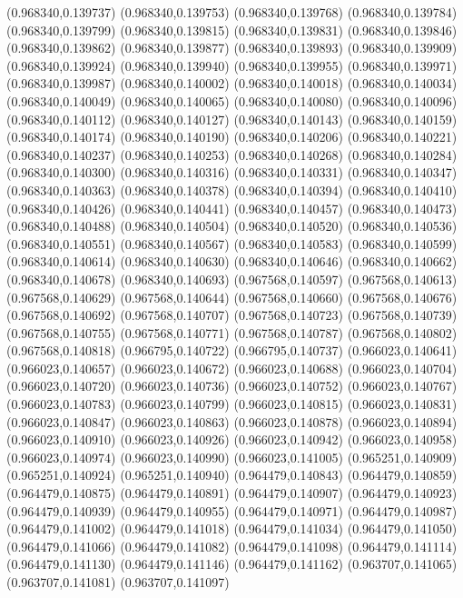 (0.968340,0.139737)
(0.968340,0.139753)
(0.968340,0.139768)
(0.968340,0.139784)
(0.968340,0.139799)
(0.968340,0.139815)
(0.968340,0.139831)
(0.968340,0.139846)
(0.968340,0.139862)
(0.968340,0.139877)
(0.968340,0.139893)
(0.968340,0.139909)
(0.968340,0.139924)
(0.968340,0.139940)
(0.968340,0.139955)
(0.968340,0.139971)
(0.968340,0.139987)
(0.968340,0.140002)
(0.968340,0.140018)
(0.968340,0.140034)
(0.968340,0.140049)
(0.968340,0.140065)
(0.968340,0.140080)
(0.968340,0.140096)
(0.968340,0.140112)
(0.968340,0.140127)
(0.968340,0.140143)
(0.968340,0.140159)
(0.968340,0.140174)
(0.968340,0.140190)
(0.968340,0.140206)
(0.968340,0.140221)
(0.968340,0.140237)
(0.968340,0.140253)
(0.968340,0.140268)
(0.968340,0.140284)
(0.968340,0.140300)
(0.968340,0.140316)
(0.968340,0.140331)
(0.968340,0.140347)
(0.968340,0.140363)
(0.968340,0.140378)
(0.968340,0.140394)
(0.968340,0.140410)
(0.968340,0.140426)
(0.968340,0.140441)
(0.968340,0.140457)
(0.968340,0.140473)
(0.968340,0.140488)
(0.968340,0.140504)
(0.968340,0.140520)
(0.968340,0.140536)
(0.968340,0.140551)
(0.968340,0.140567)
(0.968340,0.140583)
(0.968340,0.140599)
(0.968340,0.140614)
(0.968340,0.140630)
(0.968340,0.140646)
(0.968340,0.140662)
(0.968340,0.140678)
(0.968340,0.140693)
(0.967568,0.140597)
(0.967568,0.140613)
(0.967568,0.140629)
(0.967568,0.140644)
(0.967568,0.140660)
(0.967568,0.140676)
(0.967568,0.140692)
(0.967568,0.140707)
(0.967568,0.140723)
(0.967568,0.140739)
(0.967568,0.140755)
(0.967568,0.140771)
(0.967568,0.140787)
(0.967568,0.140802)
(0.967568,0.140818)
(0.966795,0.140722)
(0.966795,0.140737)
(0.966023,0.140641)
(0.966023,0.140657)
(0.966023,0.140672)
(0.966023,0.140688)
(0.966023,0.140704)
(0.966023,0.140720)
(0.966023,0.140736)
(0.966023,0.140752)
(0.966023,0.140767)
(0.966023,0.140783)
(0.966023,0.140799)
(0.966023,0.140815)
(0.966023,0.140831)
(0.966023,0.140847)
(0.966023,0.140863)
(0.966023,0.140878)
(0.966023,0.140894)
(0.966023,0.140910)
(0.966023,0.140926)
(0.966023,0.140942)
(0.966023,0.140958)
(0.966023,0.140974)
(0.966023,0.140990)
(0.966023,0.141005)
(0.965251,0.140909)
(0.965251,0.140924)
(0.965251,0.140940)
(0.964479,0.140843)
(0.964479,0.140859)
(0.964479,0.140875)
(0.964479,0.140891)
(0.964479,0.140907)
(0.964479,0.140923)
(0.964479,0.140939)
(0.964479,0.140955)
(0.964479,0.140971)
(0.964479,0.140987)
(0.964479,0.141002)
(0.964479,0.141018)
(0.964479,0.141034)
(0.964479,0.141050)
(0.964479,0.141066)
(0.964479,0.141082)
(0.964479,0.141098)
(0.964479,0.141114)
(0.964479,0.141130)
(0.964479,0.141146)
(0.964479,0.141162)
(0.963707,0.141065)
(0.963707,0.141081)
(0.963707,0.141097)
